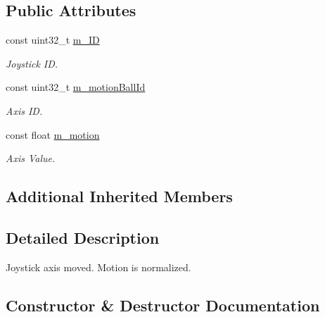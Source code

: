 \subsection*{Public Attributes}
\begin{DoxyCompactItemize}
\item 
\mbox{\label{classJoystickMotionEvent_a1255cfd9f72310fd2b4d15dca960b6e9}} 
const uint32\+\_\+t \hyperlink{classJoystickMotionEvent_a1255cfd9f72310fd2b4d15dca960b6e9}{m\+\_\+\+ID}
\begin{DoxyCompactList}\small\item\em Joystick ID. \end{DoxyCompactList}\item 
\mbox{\label{classJoystickMotionEvent_af523852b7652322e5d930026bff0a414}} 
const uint32\+\_\+t \hyperlink{classJoystickMotionEvent_af523852b7652322e5d930026bff0a414}{m\+\_\+motion\+Ball\+Id}
\begin{DoxyCompactList}\small\item\em Axis ID. \end{DoxyCompactList}\item 
\mbox{\label{classJoystickMotionEvent_aa8f668fc452c9ffa5c6e8bbeb98465d3}} 
const float \hyperlink{classJoystickMotionEvent_aa8f668fc452c9ffa5c6e8bbeb98465d3}{m\+\_\+motion}
\begin{DoxyCompactList}\small\item\em Axis Value. \end{DoxyCompactList}\end{DoxyCompactItemize}
\subsection*{Additional Inherited Members}


\subsection{Detailed Description}
Joystick axis moved. Motion is normalized. 

\subsection{Constructor \& Destructor Documentation}
\mbox{\label{classJoystickMotionEvent_a877bb7736b43358c51e37e88f9670bcc}} 
